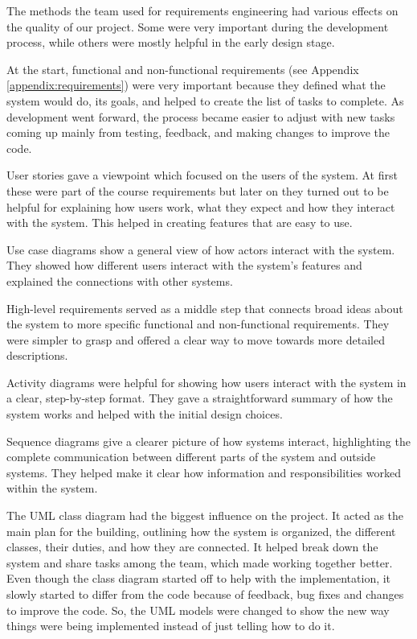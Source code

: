 The methods the team used for requirements engineering had various effects on the quality of our project. Some were very important during the development process, while others were mostly helpful in the early design stage.\par
At the start, functional and non-functional requirements (see Appendix \ref{appendix:requirements}) were very important because they defined what the system would do, its goals, and helped to create the list of tasks to complete. As development went forward, the process became easier to adjust with new tasks coming up mainly from testing, feedback, and making changes to improve the code.\par
User stories gave a viewpoint which focused on the users of the system. At first these were part of the course requirements but later on they turned out to be helpful for explaining how users work, what they expect and how they interact with the system. This helped in creating features that are easy to use.\par
Use case diagrams show a general view of how actors interact with the system. They showed how different users interact with the system's features and explained the connections with other systems.\par
High-level requirements served as a middle step that connects broad ideas about the system to more specific functional and non-functional requirements. They were simpler to grasp and offered a clear way to move towards more detailed descriptions.\par
Activity diagrams were helpful for showing how users interact with the system in a clear, step-by-step format. They gave a straightforward summary of how the system works and helped with the initial design choices.\par

Sequence diagrams give a clearer picture of how systems interact, highlighting the complete communication between different parts of the system and outside systems. They helped make it clear how information and responsibilities worked within the system.\par

The UML class diagram had the biggest influence on the project. It acted as the main plan for the building, outlining how the system is organized, the different classes, their duties, and how they are connected. It helped break down the system and share tasks among the team, which made working together better. Even though the class diagram started off to help with the implementation, it slowly started to differ from the code because of feedback, bug fixes and changes to improve the code. So, the UML models were changed to show the new way things were being implemented instead of just telling how to do it.\par

